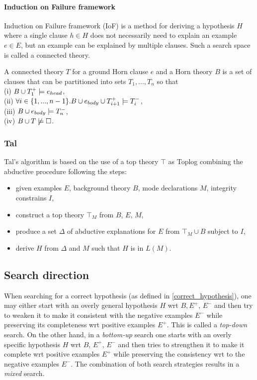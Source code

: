 \paragraph{Induction on Failure framework\cite{kimber2012learning}}
Induction on Failure framework (IoF) is a method for deriving a hypothesis $H$ where a single clause $h \in H$ does not necessarily need to explain an example $e \in E$, but an example can be explained by multiple clauses. Such a search space is called a connected theory.
\begin{defn}
A connected theory $T$ for a ground Horn clause $e$ and a Horn theory $B$ is a set of clauses that can be partitioned into sets $T_1, ..., T_n$ so that\\
(i) $B \cup T_1^+ \models e_{head}$,\\
(ii) $\forall i \in \{1, ..., n-1\}. B \cup e_{body} \cup T_{i+1}^+ \models T_i^-$,\\
(iii) $B \cup e_{body} \models T_n^-$,\\
(iv) $B \cup T \not\models \square$.
\end{defn}

\subsubsection{Tal\cite{corapi2011nonmonotonic}}
Tal's algorithm is based on the use of a top theory $\top$ as Toplog combining the abductive procedure following the steps:
\begin{itemize}
\item given examples $E$, background theory $B$, mode declarations $M$, integrity constrains $I$,
\item construct a top theory $\top_M$ from $B$, $E$, $M$,
\item produce a set $\Delta$ of abductive explanations for $E$ from $\top_M \cup B$ subject to $I$,
\item derive $H$ from $\Delta$ and $M$ such that $H$ is in $L(M)$.
\end{itemize}

\subsection{Search direction\cite{nienhuys1997foundations}}
When searching for a correct hypothesis (as defined in \ref{correct_hypothesis}), one may either start with an overly general hypothesis $H$ wrt $B, E^+$, $E^-$ and then try to weaken it to make it consistent with the negative examples $E^-$ while preserving its completeness wrt positive examples $E^+$. This is called a \emph{top-down} search.
On the other hand, in a \emph{bottom-up} search one starts with an overly specific hypothesis $H$ wrt $B$, $E^+$, $E^-$ and then tries to strengthen it to make it complete wrt positive examples $E^+$ while preserving the consistency wrt to the negative examples $E^-$.
The combination of both search strategies results in a \emph{mixed} search.

